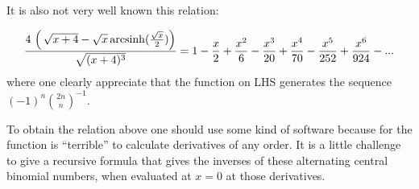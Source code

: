 \documentclass[12pt]{article}
\begin{document}
It is also not very well known this relation:

$$\frac{
4\,\left(\,{\sqrt{x+4}}-{\sqrt{x}}\,{\rm{arcsinh}}(\frac{{\sqrt{x}}}{2})\right)
}
{
\sqrt{(x+4)^3}
}
=1-\frac{x}{2}+\frac{x^2}{6}-\frac{x^3}{20}+\frac{x^4}{70}-\frac{x^5}{252}+\frac{x^6}{924}-...$$
where one clearly appreciate that the function on LHS generates the sequence $(-1)^n{2n\choose n}^{-1}$.

To obtain the relation above one should use some kind of software because for the function is ``terrible'' to calculate derivatives of any order. It is a little challenge to give a recursive formula that gives the inverses of these alternating central binomial numbers, when evaluated at $x=0$ at those derivatives.
\end{document}
